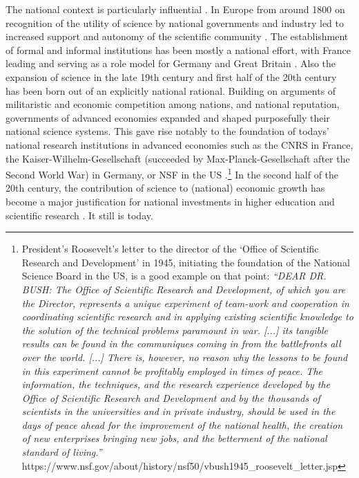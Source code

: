The national context is particularly influential \citep{ben1971scientist}. In Europe from around 1800 on recognition of the utility of science by national governments and industry led to increased support and autonomy of the scientific community \citep{beaver1978studies}. The establishment of formal and informal institutions has been mostly a national effort, with France leading and serving as a role model for Germany and Great Britain \citep{beaver1979studies}. Also the expansion of science in the late 19th century and first half of the 20th century has been born out of an explicitly national rational. Building on arguments of militaristic and economic competition among nations, and national reputation, governments of advanced economies expanded and shaped purposefully their national science systems. This gave rise notably to the foundation of todays' national research institutions in advanced economies such as the CNRS in France, the Kaiser-Wilhelm-Gesellschaft (succeeded by Max-Planck-Gesellschaft after the Second World War) in Germany, or NSF in the US \citep{ben1971scientist}.\footnote{President's Roosevelt's letter to the director of the `Office of Scientific Research and Development' in 1945, initiating the foundation of the National Science Board in the US, is a good example on that point: \textit{``DEAR DR. BUSH: The Office of Scientific Research and Development, of which you are the Director, represents a unique experiment of team-work and cooperation in coordinating scientific research and in applying existing scientific knowledge to the solution of the technical problems paramount in war. [...] its tangible results can be found in the communiques coming in from the battlefronts all over the world. [...] There is, however, no reason why the lessons to be found in this experiment cannot be profitably employed in times of peace. The information, the techniques, and the research experience developed by the Office of Scientific Research and Development and by the thousands of scientists in the universities and in private industry, should be used in the days of peace ahead for the improvement of the national health, the creation of new enterprises bringing new jobs, and the betterment of the national standard of living.''} https://www.nsf.gov/about/history/nsf50/vbush1945\_roosevelt\_letter.jsp} In the second half of the 20th century, the contribution of science to (national) economic growth has become a major justification for national investments in higher education and scientific research \citep{pavitt1991makes}. It still is today.

